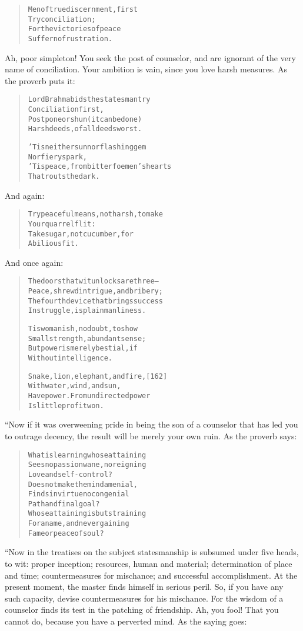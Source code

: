 \documentclass[article, twoside, 14pt]{memoir}
\renewenvironment{verbatim}{%
\begin{quote}%
\vskip -10pt%
\begin{alltt}\normalfont\large}{\end{alltt}%
\end{quote}%
\vskip -10pt
} %
\begin{document}
\begin{verbatim}
Men of true discernment, first
    Try conciliation;
For the victories of peace
    Suffer no frustration.
\end{verbatim}
Ah, poor simpleton! You seek the post of counselor, and are
ignorant of the very name of conciliation. Your ambition is vain,
since you love harsh measures. As the proverb puts it:

\begin{verbatim}
Lord Brahma bids the statesman try
    Conciliation first,
Postpone or shun (it can be done)
    Harsh deeds, of all deeds worst.

'Tis neither sun nor flashing gem
    Nor fiery spark,
'Tis peace, from bitter foemen's hearts
    That routs the dark.
\end{verbatim}
And again:

\begin{verbatim}
Try peaceful means, not harsh, to make
    Your quarrel flit:
Take sugar, not cucumber, for
    A bilious fit.
\end{verbatim}
And once again:

\begin{verbatim}
The doors that wit unlocks are three--
Peace, shrewd intrigue, and bribery;
The fourth device that brings success
In struggle, is plain manliness.

Tis womanish, no doubt, to show
    Small strength, abundant sense;
But power is merely bestial, if
    Without intelligence.

Snake, lion, elephant, and fire,                        [162]
    With water, wind, and sun,
Have power. From undirected power
    Is little profit won.
\end{verbatim}
“Now if it was overweening pride in being the son of a counselor
that has led you to outrage decency, the result will be merely your
own ruin. As the proverb says:

\begin{verbatim}
What is learning whose attaining
Sees no passion wane, no reigning
    Love and self-control?
Does not make the mind a menial,
Finds in virtue no congenial
    Path and final goal?
Whose attaining is but straining
For a name, and never gaining
    Fame or peace of soul?
\end{verbatim}
“Now in the treatises on the subject statesmanship is subsumed
under five heads, to wit: proper inception; resources, human and
material; determination of place and time; countermeasures for
mischance; and successful accomplishment. At the present moment,
the master finds himself in serious peril. So, if you have any such
capacity, devise countermeasures for his mischance. For the wisdom
of a counselor finds its test in the patching of friendship. Ah,
you fool! That you cannot do, because you have a perverted mind. As
the saying goes:
\end{document}
